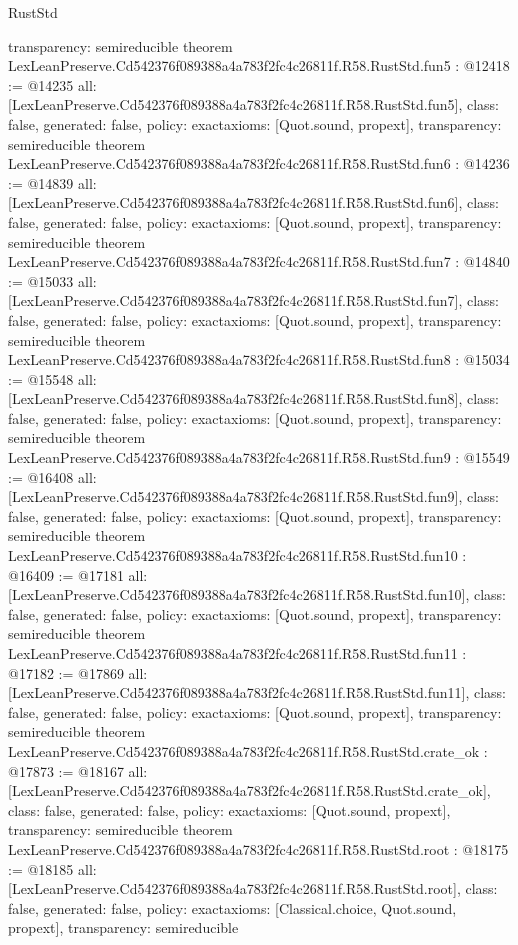 \begin{lexlean}{RustStd}
\begin{coremodule}
{  transparency: semireducible
}
theorem LexLeanPreserve.Cd542376f089388a4a783f2fc4c26811f.R58.RustStd.fun5 : @12418 := @14235 {
  all: [LexLeanPreserve.Cd542376f089388a4a783f2fc4c26811f.R58.RustStd.fun5],
  class: false,
  generated: false,
  policy: exact{axioms: [Quot.sound, propext]},
  transparency: semireducible
}
theorem LexLeanPreserve.Cd542376f089388a4a783f2fc4c26811f.R58.RustStd.fun6 : @14236 := @14839 {
  all: [LexLeanPreserve.Cd542376f089388a4a783f2fc4c26811f.R58.RustStd.fun6],
  class: false,
  generated: false,
  policy: exact{axioms: [Quot.sound, propext]},
  transparency: semireducible
}
theorem LexLeanPreserve.Cd542376f089388a4a783f2fc4c26811f.R58.RustStd.fun7 : @14840 := @15033 {
  all: [LexLeanPreserve.Cd542376f089388a4a783f2fc4c26811f.R58.RustStd.fun7],
  class: false,
  generated: false,
  policy: exact{axioms: [Quot.sound, propext]},
  transparency: semireducible
}
theorem LexLeanPreserve.Cd542376f089388a4a783f2fc4c26811f.R58.RustStd.fun8 : @15034 := @15548 {
  all: [LexLeanPreserve.Cd542376f089388a4a783f2fc4c26811f.R58.RustStd.fun8],
  class: false,
  generated: false,
  policy: exact{axioms: [Quot.sound, propext]},
  transparency: semireducible
}
theorem LexLeanPreserve.Cd542376f089388a4a783f2fc4c26811f.R58.RustStd.fun9 : @15549 := @16408 {
  all: [LexLeanPreserve.Cd542376f089388a4a783f2fc4c26811f.R58.RustStd.fun9],
  class: false,
  generated: false,
  policy: exact{axioms: [Quot.sound, propext]},
  transparency: semireducible
}
theorem LexLeanPreserve.Cd542376f089388a4a783f2fc4c26811f.R58.RustStd.fun10 : @16409 := @17181 {
  all: [LexLeanPreserve.Cd542376f089388a4a783f2fc4c26811f.R58.RustStd.fun10],
  class: false,
  generated: false,
  policy: exact{axioms: [Quot.sound, propext]},
  transparency: semireducible
}
theorem LexLeanPreserve.Cd542376f089388a4a783f2fc4c26811f.R58.RustStd.fun11 : @17182 := @17869 {
  all: [LexLeanPreserve.Cd542376f089388a4a783f2fc4c26811f.R58.RustStd.fun11],
  class: false,
  generated: false,
  policy: exact{axioms: [Quot.sound, propext]},
  transparency: semireducible
}
theorem LexLeanPreserve.Cd542376f089388a4a783f2fc4c26811f.R58.RustStd.crate_ok : @17873 := @18167 {
  all: [LexLeanPreserve.Cd542376f089388a4a783f2fc4c26811f.R58.RustStd.crate_ok],
  class: false,
  generated: false,
  policy: exact{axioms: [Quot.sound, propext]},
  transparency: semireducible
}
theorem LexLeanPreserve.Cd542376f089388a4a783f2fc4c26811f.R58.RustStd.root : @18175 := @18185 {
  all: [LexLeanPreserve.Cd542376f089388a4a783f2fc4c26811f.R58.RustStd.root],
  class: false,
  generated: false,
  policy: exact{axioms: [Classical.choice, Quot.sound, propext]},
  transparency: semireducible
}


\end{coremodule}
\end{lexlean}
